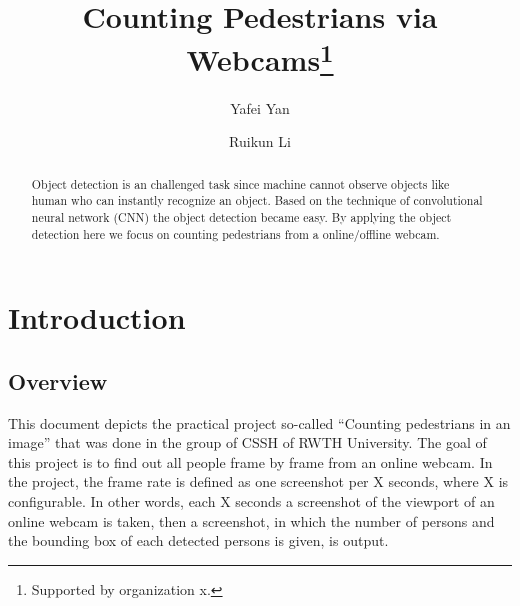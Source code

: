 \documentclass[runningheads]{llncs}
\begin{document}
%
\title{Counting Pedestrians via Webcams\thanks{Supported by organization x.}}
%
%
\author{Yafei Yan\inst{}\orcidID{} \and
Ruikun Li\inst{}\orcidID{}}
%
%
%
\maketitle              %
%
\begin{abstract}
Object detection is an challenged task since machine cannot observe objects like human who can instantly recognize an object. Based on the technique of convolutional neural network (CNN) the object detection became easy. By applying the object detection here we focus on counting pedestrians from a online/offline webcam.

\end{abstract}
%
%
%
\section{Introduction}
\subsection{Overview}
This document depicts the practical project so-called  “Counting pedestrians in an image” that was done in the group of CSSH of RWTH University. The goal of this project is to find out all people frame by frame from an online webcam. In the project, the frame rate is defined as one screenshot per X seconds, where X is configurable. In other words, each X seconds a screenshot of the viewport of an online webcam is taken, then a screenshot, in which the number of persons and the bounding box of each detected persons is given, is output.
\end{document}
